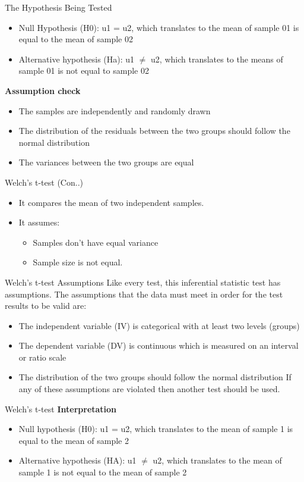 \begin{frame}[t]{The Hypothesis Being Tested}
		\begin{itemize}
		\item Null Hypothesis (H0): u1 = u2, which translates to the mean of sample 01 is equal to the mean of sample 02
		\item Alternative hypothesis (Ha): u1 $\neq$ u2, which translates to the means of sample 01 is not equal to sample 02
		\end{itemize}
	\textbf{Assumption check} \\
	\begin{itemize}
		\item The samples are independently and randomly drawn
		\item The distribution of the residuals between the two groups should follow the normal distribution
		\item The variances between the two groups are equal
	\end{itemize}
\end{frame}
\begin{frame}[t]{Welch's t-test (Con..)}
	\begin{itemize}
		\item It compares the mean of two independent samples.
		\item It assumes:
		\begin{itemize}
			\item Samples don't have equal variance
			\item Sample size is not equal.
		\end{itemize}
	\end{itemize}
Welch's t-test Assumptions Like every test, this inferential statistic test has assumptions. The assumptions that the data must meet in order for the test results to be valid are: \\
	\begin{itemize}
	\item The independent variable (IV) is categorical with at least two levels (groups)
	\item The dependent variable (DV) is continuous which is measured on an interval or ratio scale
	\item The distribution of the two groups should follow the normal distribution If any of these assumptions are violated then another test should be used.
\end{itemize}
\end{frame}
\begin{frame}[t]{Welch's t-test}
	\textbf{Interpretation} \\
	\begin{itemize}
		\item Null hypothesis (H0): u1 = u2, which translates to the mean of sample 1 is equal to the mean of sample 2
		\item Alternative hypothesis (HA): u1 $\neq$ u2, which translates to the mean of sample 1 is not equal to the mean of sample 2
	\end{itemize}
\end{frame}

